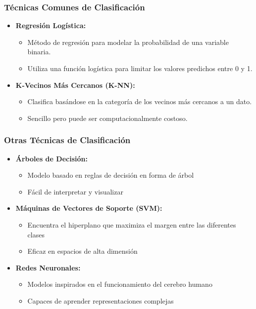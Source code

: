 \documentclass[aspectratio=169,12pt]{beamer}
\begin{document}
\begin{frame}
\frametitle{Técnicas Comunes de Clasificación}
\begin{itemize}
    \item \textbf{Regresión Logística:}
    \begin{itemize}
        \item Método de regresión para modelar la probabilidad de una variable binaria.
        \item Utiliza una función logística para limitar los valores predichos entre 0 y 1.
    \end{itemize}
    \item \textbf{K-Vecinos Más Cercanos (K-NN):}
    \begin{itemize}
        \item Clasifica basándose en la categoría de los vecinos más cercanos a un dato.
        \item Sencillo pero puede ser computacionalmente costoso.
    \end{itemize}
\end{itemize}
\end{frame}

\begin{frame}
\frametitle{Otras Técnicas de Clasificación}
\begin{itemize}
    \item \textbf{Árboles de Decisión:}
    \begin{itemize}
        \item Modelo basado en reglas de decisión en forma de árbol
        \item Fácil de interpretar y visualizar
    \end{itemize}
    \item \textbf{Máquinas de Vectores de Soporte (SVM):}
    \begin{itemize}
        \item Encuentra el hiperplano que maximiza el margen entre las diferentes clases
        \item Eficaz en espacios de alta dimensión
    \end{itemize}
    \item \textbf{Redes Neuronales:}
    \begin{itemize}
        \item Modelos inspirados en el funcionamiento del cerebro humano
        \item Capaces de aprender representaciones complejas
    \end{itemize}
\end{itemize}
\end{frame}
\end{document}
